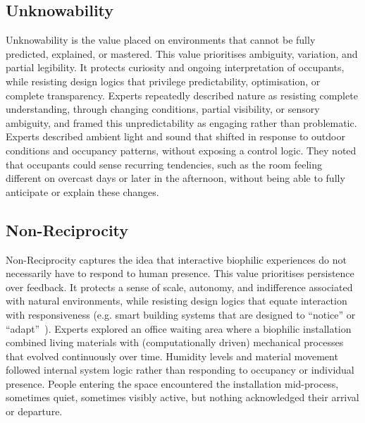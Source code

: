 \subsection{Unknowability}
Unknowability is the value placed on environments that cannot be fully predicted, explained, or mastered. This value prioritises ambiguity, variation, and partial legibility. It protects curiosity and ongoing interpretation of occupants, while resisting design logics that privilege predictability, optimisation, or complete transparency. Experts repeatedly described nature as resisting complete understanding, through changing conditions, partial visibility, or sensory ambiguity, and framed this unpredictability as engaging rather than problematic. Experts described ambient light and sound that shifted in response to outdoor conditions and occupancy patterns, without exposing a control logic. They noted that occupants could sense recurring tendencies, such as the room feeling different on overcast days or later in the afternoon, without being able to fully anticipate or explain these changes.

\subsection{Non-Reciprocity}
Non-Reciprocity captures the idea that interactive biophilic experiences do not necessarily have to respond to human presence. This value prioritises persistence over feedback. It protects a sense of scale, autonomy, and indifference associated with natural environments, while resisting design logics that equate interaction with responsiveness (e.g. smart building systems that are designed to ``notice'' or ``adapt''~\cite{profita2015wall}). Experts explored an office waiting area where a biophilic installation combined living materials with (computationally driven) mechanical processes that evolved continuously over time. Humidity levels and material movement followed internal system logic rather than responding to occupancy or individual presence. People entering the space encountered the installation mid-process, sometimes quiet, sometimes visibly active, but nothing acknowledged their arrival or departure.

